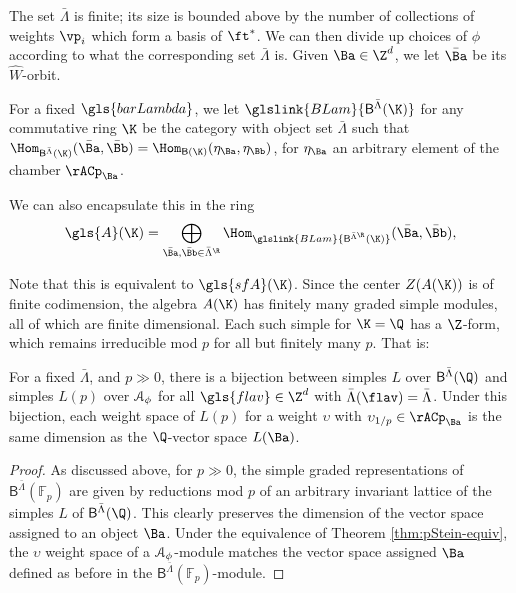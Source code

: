 The set $\bar \Lambda$ is finite; its size is bounded above by the number
of collections of weights $\vp_i$ which form a basis of $\ft^*$.   We
can then divide up choices of $\phi$ according to what the
corresponding set $\bar \Lambda$ is.  Given  $\Ba\in \Z^d$, we let
$\bar{\Ba}$ be its $\widehat{W}$-orbit.
\begin{definition}\label{def:BLam}
  For a fixed $\gls{barLambda}$, we let $\glslink{BLam}{\mathsf{B}^{\bar \Lambda}(\K)}$
  for any commutative ring $\K$ be the category with object set
  $\bar \Lambda$ such that
  $\Hom_{\mathsf{B}^{\bar
      \Lambda}(\K)}(\bar{\Ba},\bar{\Bb})=\Hom_{\mathsf{B}(\K)}(\eta_\Ba,\eta_\Bb)$,
  for $\eta_\Ba$ an arbitrary element of the chamber $\rACp_{\Ba}$.

  We can also encapsulate this in the ring
  \begin{equation}
  \gls{A}(\K)=\bigoplus_{\bar{\Ba},\bar{\Bb}\in
    \bar\Lambda^{\R}}\Hom_{\glslink{BLam}{\mathsf{B}^{\bar{\Lambda}^{\R}}(\K)}}(\bar{\Ba},\bar{\Bb}),\label{eq:A-def}
\end{equation}

\end{definition}
Note that this is
equivalent to $\gls{sfA}(\K)$.  
Since the center $Z(A(\K))$ is of finite
codimension, the algebra $A(\K)$ has finitely many graded simple
modules, all of which are finite dimensional.  Each such simple for
$\K=\Q$ has a $\Z$-form, which remains irreducible mod $p$ for all but finitely
many $p$.  That is:
\begin{theorem}
For a fixed  $\bar
\Lambda$, and  $p\gg 0$, there is a bijection
between simples $L$ over $\mathsf{B}^{\bar \Lambda}(\Q)$  and simples $L(p)$ over $\EuScript{A}_{\phi}$ for all $\gls{flav}\in \Z^d$ with $\bar
\Lambda(\flav)=\bar \Lambda$.   Under this bijection,  each weight space of
$L(p)$ for a weight $\upsilon$ with $\upsilon_{1/p}\in \rACp_{\Ba}$ is the same
dimension as the $\Q$-vector space $L(\Ba)$.  
\end{theorem}
\begin{proof}
  As discussed above, for $p\gg 0$, the simple graded representations
  of $\mathsf{B}^{\bar \Lambda}({\mathbb{F}_p})$ are given by reductions mod $p$ of an
  arbitrary invariant lattice of the
  simples $L$ of $\mathsf{B}^{\bar \Lambda}(\Q)$.  This clearly preserves the dimension
  of the vector space assigned to an object $\Ba$.  Under the
  equivalence of Theorem \ref{thm:pStein-equiv}, the $\upsilon$ weight space of
  a $\EuScript{A}_{\phi}$-module matches the vector space assigned
  $\Ba$ defined as before in the $\mathsf{B}^{\bar \Lambda}({\mathbb{F}_p})$-module.  
\end{proof}
